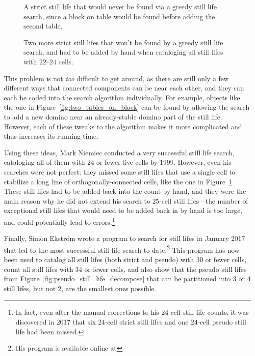 \begin{figure}[!htb]
	\centering
	\begin{minipage}{.42\textwidth}
		\centering
		\caption{A strict still life that would never be found via a greedy still life search, since a block on table would be found before adding the second table.}\label{fig:two_tables_on_block}
	\end{minipage} \hfill %
	\begin{minipage}{.54\textwidth}
		\centering
		\caption{Two more strict still lifes that won't be found by a greedy still life search, and had to be added by hand when cataloging all still lifes with $22$--$24$ cells.}\label{fig:sl_hard_to_find}
	\end{minipage}
\end{figure}

This problem is not \emph{too} difficult to get around, as there are still only a few different ways that connected components can be near each other, and they can each be coded into the search algorithm individually. For example, objects like the one in Figure~\ref{fig:two_tables_on_block} can be found by allowing the search to add a new domino near an already-stable domino part of the still life. However, each of these tweaks to the algorithm makes it more complicated and thus increases its running time.

Using these ideas, Mark Niemiec conducted a very successful still life search, cataloging all of them with $24$ or fewer live cells by 1999. However, even his searches were not perfect; they missed some still lifes that use a single cell to stabilize a long line of orthogonally-connected cells, like the one in Figure~\ref{fig:sl_hard_to_find}. These still lifes had to be added back into the count by hand, and they were the main reason why he did not extend his search to $25$-cell still lifes---the number of exceptional still lifes that would need to be added back in by hand is too large, and could potentially lead to errors.\footnote{In fact, even after the manual corrections to his $24$-cell still life counts, it was discovered in 2017 that six $24$-cell strict still lifes and one $24$-cell pseudo still life had been missed.}

Finally, Simon Ekström wrote a program to search for still lifes in January 2017 that led to the most successful still life search to date.\footnote{His program is available online at } This program has now been used to catalog all still lifes (both strict and pseudo) with $30$ or fewer cells, count all still lifes with $34$ or fewer cells, and also show that the pseudo still lifes from Figure~\ref{fig:pseudo_still_life_decompose} that can be partitioned into $3$ or $4$ still lifes, but not $2$, are the smallest ones possible.


